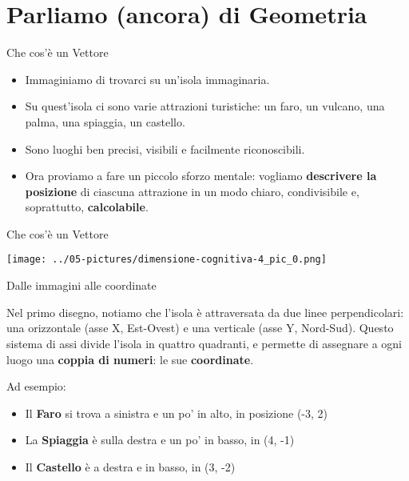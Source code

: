 \documentclass[aspectratio=169]{beamer}
\begin{document}
\section{Parliamo (ancora) di Geometria}
%
%
\begin{frame}{Che cos'è un Vettore}
\begin{itemize}
\item Immaginiamo di trovarci su un'isola immaginaria. 
\item Su quest'isola ci sono varie attrazioni turistiche: un faro, un vulcano, una palma, una spiaggia, un castello. 
\item Sono luoghi ben precisi, visibili e facilmente riconoscibili. \item Ora proviamo a fare un piccolo sforzo mentale: vogliamo \textbf{descrivere la posizione} di ciascuna attrazione in un modo chiaro, condivisibile e, soprattutto, \textbf{calcolabile}.
\end{itemize}
\end{frame}
%
%
\begin{frame}{Che cos'è un Vettore}
\begin{center}
\texttt{[image: ../05-pictures/dimensione-cognitiva-4\_pic\_0.png]} 
\end{center}
\end{frame}
%
%
\begin{frame}{Dalle immagini alle coordinate} 

Nel primo disegno, notiamo che l'isola è attraversata da due linee perpendicolari: una orizzontale (asse X, Est-Ovest) e una verticale (asse Y, Nord-Sud). Questo sistema di assi divide l'isola in quattro quadranti, e permette di assegnare a ogni luogo una \textbf{coppia di numeri}: le sue \textbf{coordinate}.

Ad esempio:
\begin{itemize}
\item Il \textbf{Faro} si trova a sinistra e un po' in alto, in posizione (-3, 2)
\item La \textbf{Spiaggia} è sulla destra e un po' in basso, in (4, -1)
\item Il \textbf{Castello} è a destra e in basso, in (3, -2)
\end{itemize}

\end{frame}
%
\end{document}
